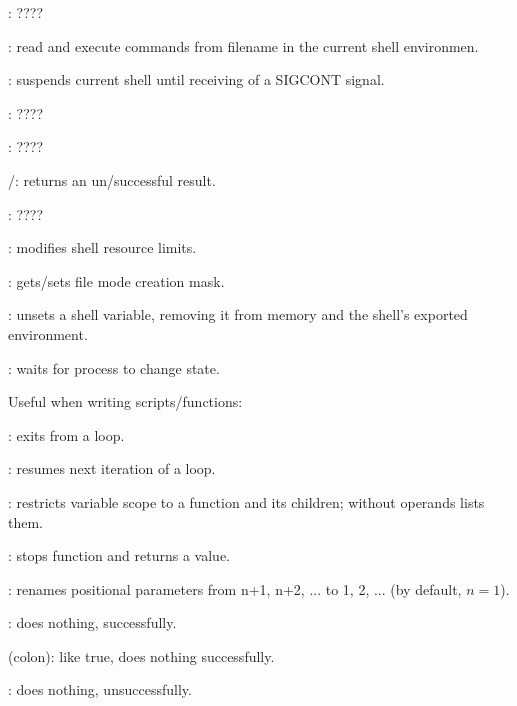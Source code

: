 \begin{compactenum}
\item [\symbolbash] : \dotfill ????

\item [\symbolbash] : read and execute commands from filename in the current shell environmen.

\item [\symbolbash] : suspends current shell until receiving of a SIGCONT signal.

\item [\symbolbash] : \dotfill ????

\item [\symbolbash] : \dotfill ????

\item [\symbolbash] /: returns an un/successful result.

\item [\symbolbash] : \dotfill ????

\item [\symbolbash] : modifies shell resource limits.

\item [\symbolbash] : gets/sets file mode creation mask.

\item [\symbolbash] : unsets a shell variable, removing it from memory and the shell's exported environment.

\item [\symbolbash] : waits for process to change state.
\end{compactenum}

Useful when writing scripts/functions:

\begin{compactenum}
\item [\symbolbash] : exits from a loop.
\item [\symbolbash] : resumes next iteration of a loop.

\item [\symbolbash] : restricts variable scope to a function and its children; without operands lists them.

\item [\symbolbash] : stops function and returns a value.

\item [\symbolbash] : renames positional parameters from n+1, n+2, ... to 1, 2, ... (by default, $n = 1$).

\item [\symbolbash] : does nothing, successfully.
\item [\symbolbash] \commandbash{:} (colon): like true, does nothing successfully.
\item [\symbolbash] : does nothing, unsuccessfully.
\end{compactenum}

%